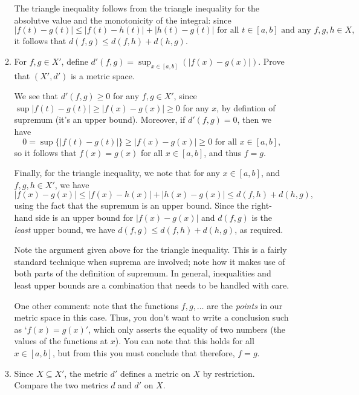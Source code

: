 \documentclass[letterpaper,12pt]{article}
\newcommand{\abs}[1]{\lvert #1\rvert}
\begin{document}
\begin{enumerate}
\begin{enumerate}
The triangle inequality follows from the triangle inequality for the absolutve value and the monotonicity of the integral: since 
\[
 \abs{f(t)-g(t)}\leq \abs{f(t)-h(t)}+\abs{h(t)-g(t)} \text{ for all } t\in [a,b] \text{ and any } f,g,h\in X,
\]
it follows that $d(f,g)\leq d(f,h)+d(h,g)$.

 \item For $f,g\in X'$, define $d'(f,g) = \sup_{x\in [a,b]}(\abs{f(x)-g(x)})$. Prove that $(X',d')$ is a metric space.

\bigskip

We see that $d'(f,g)\geq 0$ for any $f,g\in X'$, since $\sup\abs{f(t)-g(t)}\geq \abs{f(x)-g(x)}\geq 0$ for any $x$, by defintion of supremum (it's an upper bound). Moreover, if $d'(f,g)=0$, then we have
\[
 0=\sup\{\abs{f(t)-g(t)}\} \geq \abs{f(x)-g(x)}\geq 0 \text{ for all } x\in [a,b],
\]
so it follows that $f(x)=g(x)$ for all $x\in [a,b]$, and thus $f=g$.

Finally, for the triangle inequality, we note that for any $x\in [a,b]$, and $f,g,h\in X'$, we have
\[
 \abs{f(x)-g(x)} \leq \abs{f(x)-h(x)}+\abs{h(x)-g(x)}\leq d(f,h)+d(h,g),
\]
using the fact that the supremum is an upper bound. Since the right-hand side is an upper bound for $\abs{f(x)-g(x)}$ and $d(f,g)$ is the {\em least} upper bound, we have $d(f,g)\leq d(f,h)+d(h,g)$, as required.


 Note the argument given above for the triangle inequality. This is a fairly standard technique when suprema are involved; note how it makes use of both parts of the definition of supremum. In general, inequalities and least upper bounds are a combination that needs to be handled with care. 

One other comment: note that the functions $f,g,\ldots$ are the {\em points} in our metric space in this case. Thus, you don't want to write a conclusion such as `$f(x)=g(x)'$, which only asserts the equality of two numbers (the values of the functions at $x$). You can note that this holds for all $x\in [a,b]$, but from this you must conclude that therefore, $f=g$.

 \item Since $X\subseteq X'$, the metric $d'$ defines a metric on $X$ by restriction. Compare the two metrics $d$ and $d'$ on $X$.

\bigskip


\end{enumerate}
\end{enumerate}
\end{document}
